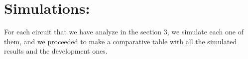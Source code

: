 \section{Simulations:}

For each circuit that we have analyze in the section 3, we simulate each one of them, and we proceeded to make a comparative table with all the simulated results and the development ones.


